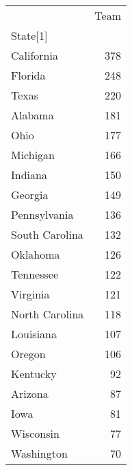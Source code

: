 \begin{tabular}{lr}
\toprule
{} &  Team \\
State[1]       &       \\
\midrule
California     &   378 \\
Florida        &   248 \\
Texas          &   220 \\
Alabama        &   181 \\
Ohio           &   177 \\
Michigan       &   166 \\
Indiana        &   150 \\
Georgia        &   149 \\
Pennsylvania   &   136 \\
South Carolina &   132 \\
Oklahoma       &   126 \\
Tennessee      &   122 \\
Virginia       &   121 \\
North Carolina &   118 \\
Louisiana      &   107 \\
Oregon         &   106 \\
Kentucky       &    92 \\
Arizona        &    87 \\
Iowa           &    81 \\
Wisconsin      &    77 \\
Washington     &    70 \\
\bottomrule
\end{tabular}
